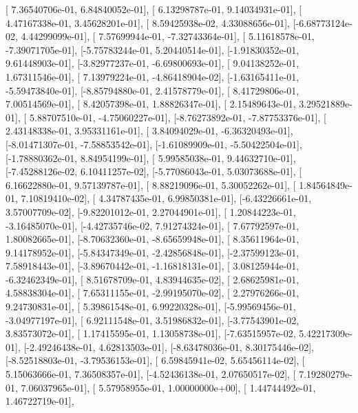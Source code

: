 \documentclass{article}
\begin{document}
       [ 7.36540706e-01,  6.84840052e-01],
       [ 6.13298787e-01,  9.14034931e-01],
       [ 4.47167338e-01,  3.45628201e-01],
       [ 8.59425938e-02,  4.33088656e-01],
       [-6.68773124e-02,  4.44299099e-01],
       [ 7.57699944e-01, -7.32743364e-01],
       [ 5.11618578e-01, -7.39071705e-01],
       [-5.75783244e-01,  5.20440514e-01],
       [-1.91830352e-01,  9.61448903e-01],
       [-3.82977237e-01, -6.69800693e-01],
       [ 9.04138252e-01,  1.67311546e-01],
       [ 7.13979224e-01, -4.86418904e-02],
       [-1.63165411e-01, -5.59473840e-01],
       [-8.85794880e-01,  2.41578779e-01],
       [ 8.41729806e-01,  7.00514569e-01],
       [ 8.42057398e-01,  1.88826347e-01],
       [ 2.15489643e-01,  3.29521889e-01],
       [ 5.88707510e-01, -4.75060227e-01],
       [-8.76273892e-01, -7.87753376e-01],
       [ 2.43148338e-01,  3.95331161e-01],
       [ 3.84094029e-01, -6.36320493e-01],
       [-8.01471307e-01, -7.58853542e-01],
       [-1.61089909e-01, -5.50422504e-01],
       [-1.78880362e-01,  8.84954199e-01],
       [ 5.99585038e-01,  9.44632710e-01],
       [-7.45288126e-02,  6.10411257e-02],
       [-5.77086043e-01,  5.03073688e-01],
       [ 6.16622880e-01,  9.57139787e-01],
       [ 8.88219096e-01,  5.30052262e-01],
       [ 1.84564849e-01,  7.10819410e-02],
       [ 4.34787435e-01,  6.99850381e-01],
       [-6.43226661e-01,  3.57007709e-02],
       [-9.82201012e-01,  2.27044901e-01],
       [ 1.20844223e-01, -3.16485070e-01],
       [-4.42735746e-02,  7.91274324e-01],
       [ 7.67792597e-01,  1.80082665e-01],
       [-8.70632360e-01, -8.65659948e-01],
       [ 8.35611964e-01,  9.14178952e-01],
       [-5.84347349e-01, -2.42856848e-01],
       [-2.37599123e-01,  7.58918443e-01],
       [-3.89670442e-01, -1.16818131e-01],
       [ 3.08125944e-01, -6.32462349e-01],
       [ 8.51678709e-01,  4.83944635e-02],
       [ 2.68625981e-01,  4.58838304e-01],
       [ 7.65311155e-01, -2.99195070e-02],
       [ 2.27976266e-01,  9.24730831e-01],
       [ 5.39861548e-01,  6.99220328e-01],
       [-5.99569456e-01, -3.04977197e-01],
       [ 6.92111548e-01,  3.51986832e-01],
       [-3.77543901e-02,  3.83573072e-01],
       [ 1.17415595e-01,  1.13058738e-01],
       [-7.63515957e-02,  5.42217309e-01],
       [-2.49246438e-01,  4.62813503e-01],
       [-8.63478036e-01,  8.30175446e-02],
       [-8.52518803e-01, -3.79536153e-01],
       [ 6.59845941e-02,  5.65456114e-02],
       [ 5.15063666e-01,  7.36508357e-01],
       [-4.52436138e-01,  2.07650517e-02],
       [ 7.19280279e-01,  7.06037965e-01],
       [ 5.57958955e-01,  1.00000000e+00],
       [ 1.44744492e-01,  1.46722719e-01],
\end{document}
